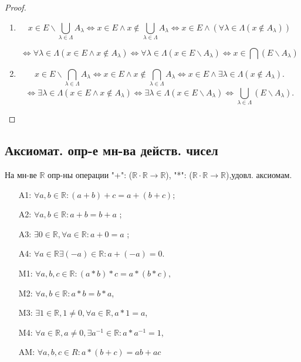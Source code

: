 \documentclass[12pt]{article}
\newcommand{\R}{\mathbb{R}}
\theoremstyle{definition}
\theoremstyle{definition}
\begin{document}
\begin{proof}
~\newline

\begin{enumerate}
    \item 
        \[
            x \in E \backslash \bigcup_{\lambda \in \Lambda} A_\lambda  \iff x \in E \land x \not\in \bigcup_{\lambda \in \Lambda} A_\lambda \iff x \in E \land (\forall \lambda \in \Lambda (x \not\in A_\lambda))
        \]

\[
    \iff \forall \lambda \in \Lambda (x \in E \land x \not\in A_\lambda) \iff \forall \lambda \in \Lambda (x \in E \backslash A_\lambda) \iff x \in \bigcap (E \backslash A_\lambda)
\]
    \item
        \[
            x \in E \backslash \bigcap_{\lambda \in \Lambda}^{}A_\lambda \iff x \in E \land x \not\in \bigcap_{\lambda\in\Lambda}^{}A_\lambda \iff x \in E \land \exists \lambda \in \Lambda (x \not\in A_\lambda)
        .\] 
        \[
        \iff \exists \lambda \in \Lambda (x \in E \land x \not\in A_\lambda) \iff \exists \lambda \in \Lambda (x \in E \backslash A_\lambda) \iff \bigcup_{\lambda \in \Lambda}^{} (E \backslash A_\lambda)
        .\] 
\end{enumerate}

\end{proof}

\subsection{Аксиомат. опр-е мн-ва действ. чисел}

На мн-ве $\R$ опр-ны операции "+": ($\R \cdot \R \rightarrow \R$), "*": ($\R \cdot \R \rightarrow \R$),удовл. аксиомам.

\begin{itemize}
    \item [A1: ] $\forall a, b \in \R \colon (a + b) + c = a + (b + c)$;
    \item [A2: ] $\forall a, b \in \R \colon a + b = b + a$ ;
    \item [A3: ] $\exists 0 \in \R, \forall a \in \R \colon a + 0 = a$ ;
    \item [A4: ] $\forall a \in \R \exists (-a) \in \R \colon  a + (-a) = 0$.
    \item [M1: ] $\forall a, b, c \in \R \colon (a * b) * c = a * (b * c),$ 
    \item [M2: ] $\forall a, b \in \R \colon a * b = b * a$,
    \item [M3: ] $\exists 1 \in \R, 1 \neq 0, \forall a \in \R, a * 1 = a$,
    \item [M4: ] $\forall a \in \R, a \neq 0, \exists a^{-1} \in \R \colon  a * a^{-1} = 1$,
    \item [AM: ] $\forall a, b, c \in R\colon  a * (b + c) = ab + ac$
\end{itemize}
\end{document}
